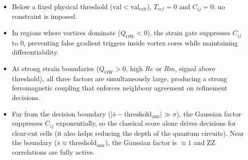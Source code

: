 \documentclass[12pt, a4paper, oneside]{report}
\begin{document}
\begin{itemize}
    \item Below a fixed physical threshold ($\text{val} < \text{val}_{\text{crit}}$), $T_{rcf} = 0$ and $C_{ij} = 0$: no constraint is imposed.
    \item In regions where vortices dominate ($Q_{\text{OW}} < 0$), the strain gate suppresses $C_{ij}$ to $0$, preventing false gradient triggers inside vortex cores while maintaining differentiability.
    \item At strong strain boundaries ($Q_{\text{OW}} > 0$, high $Re$ or $Rm$, signal above threshold), all three factors are simultaneously large, producing a strong ferromagnetic coupling that enforces neighbour agreement on refinement decisions.
    \item Far from the decision boundary ($|\bar{s} - \text{threshold}_{\text{amr}}| \gg \sigma$), the Gaussian factor suppresses $C_{ij}$ exponentially, so the classical score alone drives decisions for clear-cut cells (it also helps reducing the depth of the quantum circuits). Near the boundary ($\bar{s} \approx \text{threshold}_{\text{amr}}$), the Gaussian factor is $\approx 1$ and ZZ correlations are fully active.
\end{itemize}
\end{document}
